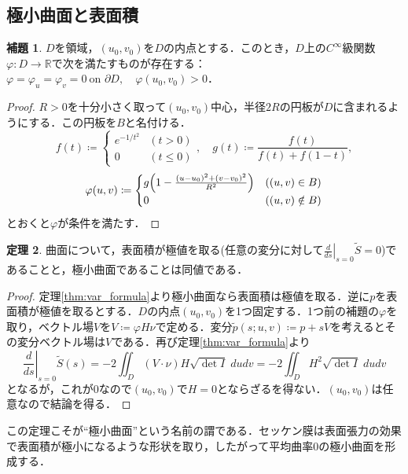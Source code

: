 \documentclass[a4j]{ltjsarticle}
\newcommand{\Rset}{\mathbb{R}}
\numberwithin{equation}{section}
\theoremstyle{definition}
\newtheorem{thm}{定理}[section]
\newtheorem{lem}[thm]{補題}
\begin{document}
\subsection{極小曲面と表面積}
\begin{lem}
    $D$を領域，$(u_0,v_0)$を$D$の内点とする．このとき，$D$上の$C^\infty$級関数$\varphi:D\to\Rset$で次を満たすものが存在する：$\varphi=\varphi_u=\varphi_v=0\ \text{on $\partial D$},\quad \varphi(u_0,v_0)>0$．
\end{lem}
\begin{proof}
    $R>0$を十分小さく取って$(u_0,v_0)$中心，半径$2R$の円板が$D$に含まれるようにする．この円板を$B$と名付ける． 
    \begin{equation}
        f(t)\coloneq \begin{cases}
            e^{-1/t^2} & (t>0)\\
            0 & (t\leq0)
        \end{cases},\quad g(t)\coloneq \frac{f(t)}{f(t)+f(1-t)},
    \end{equation}
    \begin{equation}
        \varphi(u,v)\coloneq \begin{cases}
            g\qty(1-\frac{(u-u_0)^2+(v-v_0)^2}{R^2}) & ((u,v)\in B)\\
            0 & ((u,v)\notin B)
        \end{cases}
    \end{equation}
    とおくと$\varphi$が条件を満たす．
\end{proof}
\begin{thm}
    曲面について，表面積が極値を取る(任意の変分に対して$\left.\frac{d}{ds}\right|_{s=0}\widetilde{S}=0$)であることと，極小曲面であることは同値である．
\end{thm}
\begin{proof}
    定理\ref{thm:var_formula}より極小曲面なら表面積は極値を取る．逆に$p$を表面積が極値を取るとする．$D$の内点$(u_0,v_0)$を1つ固定する．1つ前の補題の$\varphi$を取り，ベクトル場$V$を$V\coloneq \varphi H \nu$で定める．変分$\widetilde{p}(s;u,v)\coloneq p+sV$を考えるとその変分ベクトル場は$V$である．再び定理\ref{thm:var_formula}より 
    \begin{equation}
        \left.\frac{d}{ds}\right|_{s=0}\widetilde{S}(s)=-2\iint_{D}(V\cdot \nu) H\sqrt{\det I}\;dudv=-2\iint_{D}H^2\sqrt{\det I}\; dudv 
    \end{equation}
    となるが，これが0なので$(u_0,v_0)$で$H=0$とならざるを得ない．$(u_0,v_0)$は任意なので結論を得る．
\end{proof}
この定理こそが``極小曲面''という名前の謂である．セッケン膜は表面張力の効果で表面積が極小になるような形状を取り，したがって平均曲率0の極小曲面を形成する．
\end{document}
